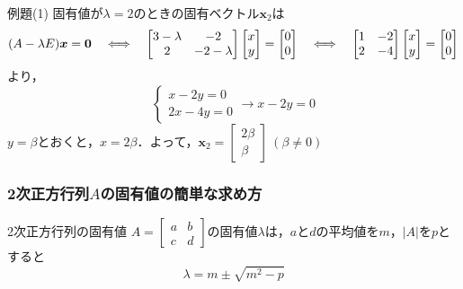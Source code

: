 \begin{tip}{例題(1)}
	固有値が$\lambda = 2$のときの固有ベクトル$\bm{x}_2$は
	\begin{equation*}
		(A - \lambda E)\bm{x} = \bm{0} \quad\Longleftrightarrow\quad \begin{bmatrix}
			3 - \lambda & -2\\ 2 & -2 - \lambda
		\end{bmatrix}
		\begin{bmatrix}
			x\\ y
		\end{bmatrix} =
		\begin{bmatrix}
			0\\ 0
		\end{bmatrix} \quad\Longleftrightarrow\quad
		\begin{bmatrix}
			1 & -2\\ 2 & -4
		\end{bmatrix}
		\begin{bmatrix}
			x\\ y
		\end{bmatrix} =
		\begin{bmatrix}
			0\\ 0
		\end{bmatrix}
	\end{equation*}
	より，
	\begin{equation*}
		\begin{cases*}
			x - 2y = 0\\ 2x - 4y = 0
		\end{cases*}
		\longrightarrow x - 2y = 0
	\end{equation*}
	$y = \beta$とおくと，$x = 2\beta$．よって，$\bm{x}_2 =
	\begin{bmatrix}
		2\beta\\ \beta
	\end{bmatrix}\ (\beta \ne 0)$
\end{tip}



\subsubsection*{2次正方行列$A$の固有値の簡単な求め方}

\begin{kousiki}{2次正方行列の固有値}
	$A =
	\begin{bmatrix}
		a & b\\ c & d
	\end{bmatrix}$の固有値$\lambda$は，$a$と$d$の平均値を$m$，$|A|$を$p$とすると
	\begin{equation}
		\lambda = m \pm \sqrt{m^2 - p}
	\end{equation}
\end{kousiki}

